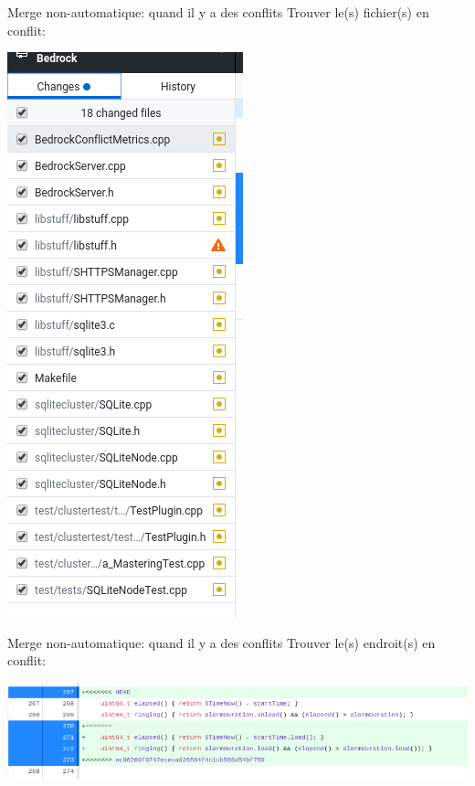 \documentclass{beamer}
\begin{document}
\begin{frame}{Merge non-automatique: quand il y a des conflits}
    Trouver le(s) fichier(s) en conflit:\\
    \begin{center}
	 	   \includegraphics[scale=0.4]{img/github_desktop/conflit_2.png}
    \end{center}
\end{frame}

\begin{frame}{Merge non-automatique: quand il y a des conflits}
    Trouver le(s) endroit(s) en conflit:\\
    \begin{center}
	 	   \includegraphics[scale=0.4]{img/github_desktop/conflit_3.png}
    \end{center}
\end{frame}
\end{document}
